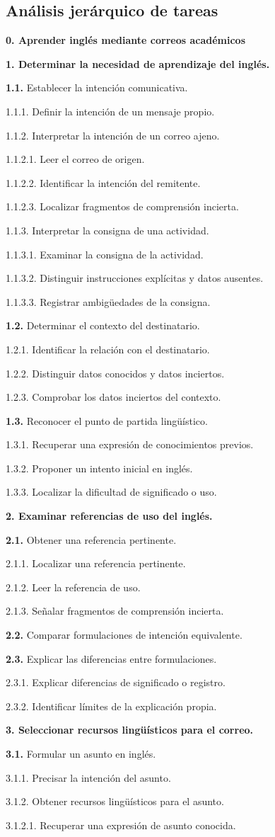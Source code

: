 \documentclass[10pt,a4paper]{article}
\newcommand{\HTAline}[3]{\par\noindent\hspace*{#1cm}\begin{minipage}{\dimexpr\linewidth-#1cm\relax}#3 #2\end{minipage}\par}
\begin{document}
\subsection*{Análisis jerárquico de tareas}
\HTAline{0.0}{\textbf{0. Aprender inglés mediante correos académicos}}{}
\HTAline{0.0}{\textbf{1. Determinar la necesidad de aprendizaje del inglés.}}{}
\HTAline{0.4}{\textbf{1.1.} Establecer la intención comunicativa.}{}
\HTAline{0.8}{1.1.1. Definir la intención de un mensaje propio.}{}
\HTAline{0.8}{1.1.2. Interpretar la intención de un correo ajeno.}{}
\HTAline{1.2000000000000002}{1.1.2.1. Leer el correo de origen.}{}
\HTAline{1.2000000000000002}{1.1.2.2. Identificar la intención del remitente.}{}
\HTAline{1.2000000000000002}{1.1.2.3. Localizar fragmentos de comprensión incierta.}{}
\HTAline{0.8}{1.1.3. Interpretar la consigna de una actividad.}{}
\HTAline{1.2000000000000002}{1.1.3.1. Examinar la consigna de la actividad.}{}
\HTAline{1.2000000000000002}{1.1.3.2. Distinguir instrucciones explícitas y datos ausentes.}{}
\HTAline{1.2000000000000002}{1.1.3.3. Registrar ambigüedades de la consigna.}{}
\HTAline{0.4}{\textbf{1.2.} Determinar el contexto del destinatario.}{}
\HTAline{0.8}{1.2.1. Identificar la relación con el destinatario.}{}
\HTAline{0.8}{1.2.2. Distinguir datos conocidos y datos inciertos.}{}
\HTAline{0.8}{1.2.3. Comprobar los datos inciertos del contexto.}{}
\HTAline{0.4}{\textbf{1.3.} Reconocer el punto de partida lingüístico.}{}
\HTAline{0.8}{1.3.1. Recuperar una expresión de conocimientos previos.}{}
\HTAline{0.8}{1.3.2. Proponer un intento inicial en inglés.}{}
\HTAline{0.8}{1.3.3. Localizar la dificultad de significado o uso.}{}
\HTAline{0.0}{\textbf{2. Examinar referencias de uso del inglés.}}{}
\HTAline{0.4}{\textbf{2.1.} Obtener una referencia pertinente.}{}
\HTAline{0.8}{2.1.1. Localizar una referencia pertinente.}{}
\HTAline{0.8}{2.1.2. Leer la referencia de uso.}{}
\HTAline{0.8}{2.1.3. Señalar fragmentos de comprensión incierta.}{}
\HTAline{0.4}{\textbf{2.2.} Comparar formulaciones de intención equivalente.}{}
\HTAline{0.4}{\textbf{2.3.} Explicar las diferencias entre formulaciones.}{}
\HTAline{0.8}{2.3.1. Explicar diferencias de significado o registro.}{}
\HTAline{0.8}{2.3.2. Identificar límites de la explicación propia.}{}
\HTAline{0.0}{\textbf{3. Seleccionar recursos lingüísticos para el correo.}}{}
\HTAline{0.4}{\textbf{3.1.} Formular un asunto en inglés.}{}
\HTAline{0.8}{3.1.1. Precisar la intención del asunto.}{}
\HTAline{0.8}{3.1.2. Obtener recursos lingüísticos para el asunto.}{}
\HTAline{1.2000000000000002}{3.1.2.1. Recuperar una expresión de asunto conocida.}{}
\end{document}

